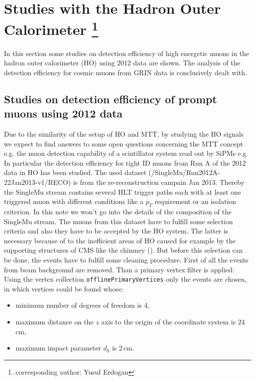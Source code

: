 \section[Studies with the Hadron Outer Calorimeter]{Studies with the Hadron Outer Calorimeter \footnote{corresponding author: Yusuf Erdogan}}
\label{sec:HOstudies}
	In this section some studies on detection efficiency of high energetic muons in the hadron outer calorimeter (HO) using 2012 data are shown.
	The analysis of the detection efficiency for cosmic muons from GRIN data is conclusively dealt with.
	\subsection{Studies on detection efficiency of prompt muons using 2012 data}
		Due to the similarity of the setup of HO and MTT, by studying the HO signals we expect to find answers to some open questions concerning the MTT concept e.g. the muon detection capability of a
		scintillator system read out by SiPMs e.g.
		In particular the detection efficiency for tight ID muons from Run A of the 2012 data in HO has been studied.
		The used dataset (/SingleMu/Run2012A-22Jan2013-v1/RECO) is from the re-reconstruction campain Jan 2013.
		Thereby the SingleMu stream contains several HLT trigger paths each with at least one triggered muon with different conditions like a $p_T$ requirement or an isolation criterion.
		In this note we won't go into the details of the composition of the SingleMu stream. 
		The muons from this dataset have to fulfill some selection criteria and also they have to be accepted by the HO system.
		The latter is necessary because of to the inefficient areas of HO caused for example by the supporting structures of CMS like the chimney (\cite{JINST}).
		But before this selection can be done, the events have to fulfill some cleaning procedure.
		First of all the events from beam background are removed.
		Than a primary vertex filter is applied:
		Using the vertex collection \verb+offlinePrimaryVertices+ only the events are chosen, in which vertices could be found whose:
			\begin{itemize}
				\item minimum number of degrees of freedom is 4,
				\item maximum distance on the $z$ axis to the origin of the coordinate system is 24\,cm,
				\item maximum impact parameter $d_0$ is 2\,cm.
			\end{itemize}
